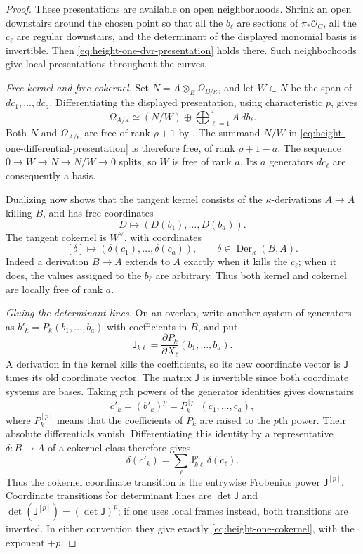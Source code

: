 \begin{proof}
These presentations are available on open neighborhoods.  Shrink an
open downstairs around the chosen point so that all the $b_\ell$ are
sections of $\pi_*\mathcal O_C$, all the $c_\ell$ are regular downstairs,
and the determinant of the displayed monomial basis is invertible.
Then \eqref{eq:height-one-dvr-presentation} holds there.  Such
neighborhoods give local presentations throughout the curves.

\textit{Free kernel and free cokernel.}
Set $N=A\otimes_B\Omega_{B/\kappa}$, and let $W\subset N$ be the span
of $dc_1,\ldots,dc_a$.  Differentiating the displayed presentation,
using characteristic $p$, gives
\begin{equation}
 \Omega_{A/\kappa}\simeq
       (N/W)\oplus\bigoplus_{\ell=1}^a A\,db_\ell.
 \label{eq:height-one-differential-presentation}
\end{equation}
Both $N$ and $\Omega_{A/\kappa}$ are free of rank $\rho+1$ by
.  The summand $N/W$ in
\eqref{eq:height-one-differential-presentation} is therefore free,
of rank $\rho+1-a$.  The sequence
$0\to W\to N\to N/W\to0$ splits, so $W$ is free of rank $a$.
Its $a$ generators $dc_\ell$ are consequently a basis.

Dualizing now shows that the tangent kernel consists of the
$\kappa$-derivations $A\to A$ killing $B$, and has free coordinates
\[
 D\longmapsto(D(b_1),\ldots,D(b_a)).
\]
The tangent cokernel is $W^\vee$, with coordinates
\[
 [\delta]\longmapsto
       (\delta(c_1),\ldots,\delta(c_a)),
 \qquad \delta\in\operatorname{Der}_\kappa(B,A).
\]
Indeed a derivation $B\to A$ extends to $A$ exactly when it kills
the $c_\ell$; when it does, the values assigned to the $b_\ell$ are
arbitrary.  Thus both kernel and cokernel are locally free of rank $a$.

\textit{Gluing the determinant lines.}
On an overlap, write another system of generators as
$b'_k=P_k(b_1,\ldots,b_a)$ with coefficients in $B$, and put
\[
 \mathsf J_{k\ell}=
 \frac{\partial P_k}{\partial X_\ell}(b_1,\ldots,b_a).
\]
A derivation in the kernel kills the coefficients, so its new
coordinate vector is $\mathsf J$ times its old coordinate vector.
The matrix $\mathsf J$ is invertible since both coordinate systems are bases.
Taking $p$th powers of the generator identities gives downstairs
\[
 c'_k=(b'_k)^p=P_k^{[p]}(c_1,\ldots,c_a),
\]
where $P_k^{[p]}$ means that the coefficients of $P_k$ are raised to
the $p$th power.  Their absolute differentials vanish.  Differentiating
this identity by a representative $\delta:B\to A$ of a cokernel class
therefore gives
\[
 \delta(c'_k)=\sum_\ell \mathsf J_{k\ell}^{p}\,\delta(c_\ell).
\]
Thus the cokernel coordinate transition is the entrywise Frobenius
power $\mathsf J^{[p]}$.  Coordinate transitions for determinant lines are
$\det\mathsf J$ and $\det(\mathsf J^{[p]})=(\det\mathsf J)^p$; if one uses local frames
instead, both transitions are inverted.  In either convention they
give exactly \eqref{eq:height-one-cokernel}, with the exponent $+p$.


\end{proof}
